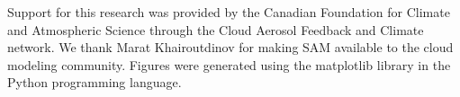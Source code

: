 \documentclass[acp]{copernicus}
\begin{document}

\begin{acknowledgements}
Support for this research was provided by the Canadian Foundation for Climate 
and Atmospheric Science through the Cloud Aerosol Feedback and Climate 
network. We thank Marat Khairoutdinov for making SAM available to the cloud 
modeling community. Figures were generated using the matplotlib library in the 
Python programming language.
\end{acknowledgements}

















\end{document}
